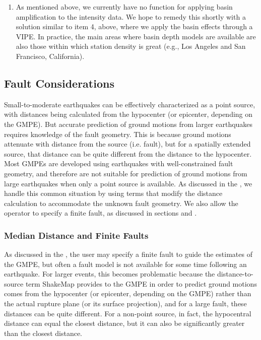 \documentclass[letterpaper,10pt,english]{sphinxmanual}
\begin{document}
\begin{enumerate}
\item {} 
As mentioned above, we currently have no function for applying basin
amplification to the intensity data. We hope to remedy this shortly with a solution
similar to item 4, above, where we apply the basin effects through a
VIPE. In practice, the main areas where basin depth models are
available are also those within which station density is great
(e.g., Los Angeles and San Francisco, California).

\end{enumerate}


\subsection{Fault Considerations}
\label{tg_processing:fault-considerations}
Small-to-moderate earthquakes can be effectively characterized as a point source, with
distances being calculated from the hypocenter (or epicenter, depending on the GMPE).
But accurate prediction of ground motions from larger earthquakes requires knowledge of
the fault geometry. This is because ground motions attenuate with
distance from the source (i.e. fault), but for a spatially extended source, that distance can be quite different
from the distance to the hypocenter. Most GMPEs are developed using earthquakes with
well-constrained fault geometry, and therefore are not suitable for prediction of ground
motions from large earthquakes when only a point source is available. As discussed in the
{\hyperref[tg_processing:sec\string-median\string-distance]{}}, we handle this common situation by using terms that modify the
distance calculation to accommodate the unknown fault geometry. We also allow the
operator to specify a finite fault, as discussed in sections {\hyperref[tg_processing:sec\string-fault\string-dimensions]{}}
and {\hyperref[tg_processing:sec\string-directivity]{}}.


\subsubsection{Median Distance and Finite Faults}
\label{tg_processing:median-distance-and-finite-faults}\label{tg_processing:sec-median-distance}
As discussed in the {\hyperref[software_guide:sm35\string-software\string-guide]{}}, the user may specify a
finite fault to guide the
estimates of the GMPE, but often a fault model is not available for some time following
an earthquake. For larger events, this becomes problematic because the
distance-to-source
term ShakeMap provides to the GMPE in order to predict ground motions comes
from the hypocenter (or epicenter, depending on the GMPE) rather than the actual rupture
plane (or its surface projection), and for a large fault, these distances can be quite
different. For a non-point source, in fact, the hypocentral distance
can equal the closest distance, but it can also be significantly greater than the
closest distance.
\end{document}
